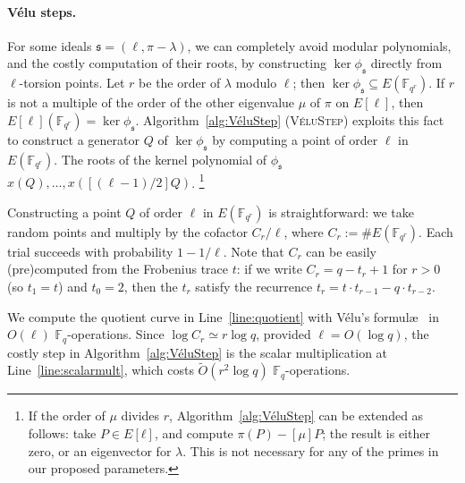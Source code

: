 \documentclass{llncs}
\newcommand{\F}{\mathbb{F}}
\newcommand{\softO}{\tilde{O}}
\newcommand{\algstyle}[1]{\textsc{#1}}
\renewcommand{\frak}{\mathfrak}
\begin{document}
\paragraph{Vélu steps.}

For some ideals $\frak{s} = (\ell,\pi-\lambda)$,
we can completely avoid modular polynomials,
and the costly computation of their roots,
by constructing $\ker\phi_{\frak{s}}$ directly from $\ell$-torsion points.
Let $r$ be the order of $\lambda$ modulo $\ell$;
then $\ker\phi_{\frak s} \subseteq E(\F_{q^r})$.
If $r$ is not a multiple of the order of the other eigenvalue $\mu$
of $\pi$ on $E[\ell]$,
then $E[\ell](\F_{q^r}) = \ker\phi_{\frak s}$.
Algorithm~\ref{alg:VéluStep} (\algstyle{VéluStep}) 
exploits this fact to construct a generator $Q$ of $\ker\phi_{\frak s}$
by computing a point of order $\ell$ in $E(\F_{q^r})$.
The roots of the kernel polynomial of $\phi_{\frak s}$
$x(Q), \ldots, x([(\ell-1)/2]Q)$.%
\footnote{If the order of $μ$ divides $r$,
  Algorithm~\ref{alg:VéluStep} can be extended as follows: take
  $P∈E[ℓ]$, and compute $π(P) - [μ]P$; the result is either zero, or
  an eigenvector for $λ$. %
  This is not necessary for any of the primes in our proposed
  parameters.}

Constructing a point $Q$ of order $\ell$ in $E(\F_{q^r})$
is straightforward:
we take random points and multiply by the cofactor $C_r/\ell$,
where $C_r := \#E(\F_{q^r})$.
Each trial succeeds with probability $1 - 1/\ell$.
Note that $C_r$ can be easily (pre)computed from the Frobenius trace $t$:
if we write $C_r = q - t_r + 1$ for 
$r > 0$ (so $t_1 = t$) and $t_0 = 2$,
then the $t_r$ satisfy the recurrence
$t_r = t\cdot t_{r-1} - q\cdot t_{r-2}$. 

We compute the quotient curve in Line~\ref{line:quotient} 
with Vélu's formul\ae~\cite{Velu71} in $O(\ell)$ $\F_q$-operations.
Since $\log C_r\simeq r\log q$, provided $\ell = O(\log q)$,
the costly step in Algorithm~\ref{alg:VéluStep} is the scalar
multiplication at Line~\ref{line:scalarmult}, which costs
$\softO(r^2\log q)$ $\F_q$-operations.
\end{document}
